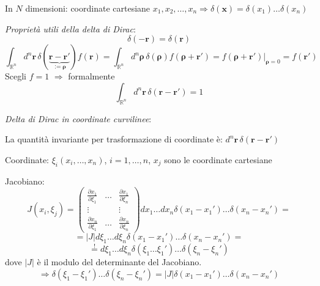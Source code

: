 \documentclass[a4paper,11pt]{report}
\newcommand{\vect}[1]{\boldsymbol{#1}}
\newcommand{\R}{\mathbb{R}}
\newcommand{\x}{\boldsymbol{x}}
\begin{document}
\medskip

In $N$ dimensioni: coordinate cartesiane $x_1,x_2,\dots,x_n \Rightarrow \delta(\x)= \delta(x_1)\dots \delta(x_n)$

\medspace

\emph{Propriet\`a utili della delta di Dirac}:
\[
\delta(-\vect{r})=\delta(\vect{r})
\]
\begin{equation}
\int_{\R^n} d^n\vect{r}\,\delta(\underbrace{\vect{r}-\vect{r}'}_{:=\vect{\rho}})f(\vect{r}) =
\int_{\R^n}d^n\vect{\rho}\,\delta(\vect{\rho})f(\vect{\rho}+\vect{r}')=
f(\vect{\rho}+\vect{r}')\Big |_{ \vect{\rho}=0}  = f(\vect{r}')
\label{1.7}
\end{equation}
Scegli $f=1$ $\Rightarrow$ formalmente 
\begin{equation}
\int_{\R^n}d^n\vect{r}\,\delta(\vect{r}-\vect{r}')=1
\end{equation}

\medspace

\emph{Delta di Dirac in coordinate curvilinee}:

La quantit\`a invariante per trasformazione di coordinate \`e: $d^n\vect{r}\,\delta(\vect{r}-\vect{r}')$

Coordinate: $\xi_i (x_i,\dots,x_n)$, $i=1,\dots,n$, $x_j$ sono le coordinate cartesiane

Jacobiano:
\[
J(x_i,\xi_j)=\left(\begin{matrix}
\frac{\partial x_1}{\partial \xi_1} & \dots & \frac{\partial x_1}{\partial \xi_n}\\
\vdots & & \vdots \\
\frac{\partial x_n}{\partial \xi_1} & \dots &\frac{\partial x_n}{\partial \xi_n}
\end{matrix}\right)dx_1\dots dx_n \delta(x_1-x_1')\dots \delta(x_n - x_n')=
\]
\[
=|J|d\xi_1\dots d\xi_n \delta(x_1 - x_1')\dots \delta(x_n-x_n')=
\]
\[
\overset{!}{=}d\xi_1 \dots d\xi_n\delta(\xi_1\dots \xi_1')\dots \delta(\xi_n - \xi_n')
\]
dove $|J|$ \`e il modulo del determinante del Jacobiano.
\begin{equation}
\Rightarrow\delta(\xi_1-\xi_1')\dots\delta(\xi_n-\xi_n')=|J|\delta(x_1-x_1')\dots\delta(x_n-x_n')
\end{equation}
\end{document}
